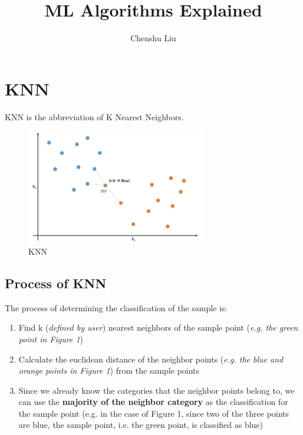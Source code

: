 \documentclass[12pt]{article}
\title{ML Algorithms Explained}
\author{Chenshu Liu}
\begin{document}
\maketitle
\thispagestyle{empty}
\tableofcontents
\listoffigures
\thispagestyle{empty}
\newpage

\section{KNN}
\setcounter{page}{1}
KNN is the abbreviation of K Nearest Neighbors.
\begin{figure}[htbp]
\begin{center}
\includegraphics[width = 0.7\textwidth]{Images/KNN.jpeg}
\caption{KNN}
\label{KNN}
\end{center}
\end{figure}

\subsection{Process of KNN}
The process of determining the classification of the sample is:
\begin{enumerate}
	\item Find k (\textit{defined by user}) nearest neighbors of the sample point (\textit{e.g. the green point in Figure 1})
	\item Calculate the euclidean distance of the neighbor points (\textit{e.g. the blue and orange points in Figure 1}) from the sample points
	\item Since we already know the categories that the neighbor points belong to, we can use the \textbf{majority of the neighbor category} as the classification for the sample point (e.g. in the case of Figure 1, since two of the three points are blue, the sample point, i.e. the green point, is classified as blue)
\end{enumerate}
\newpage
\end{document}
